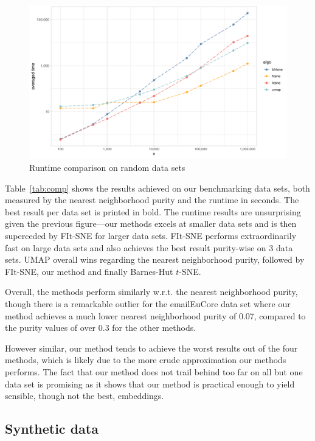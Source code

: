 \begin{figure}[tb]
  \centering
  \includegraphics[width=\textwidth]{img/runtime_comparison}
  \caption{Runtime comparison on random data sets}
  \label{fig:runtime-comp}
\end{figure}

Table~\ref{tab:comp} shows the results achieved on our benchmarking data sets, both
measured by the nearest neighborhood purity and the runtime in seconds. The best result
per data set is printed in bold. The runtime results are unsurprising given the previous
figure---our methods excels at smaller data sets and is then superceded by FIt-SNE
for larger data sets. FIt-SNE performs extraordinarily fast on large data sets and
also achieves the best result purity-wise on 3 data sets. UMAP overall wins regarding
the nearest neighborhood purity, followed by FIt-SNE, our method and finally Barnes-Hut
$t$-SNE.

Overall, the methods perform similarly w.r.t. the nearest neighborhood purity,
though there is a remarkable outlier for the emailEuCore data set where our
method achieves a much lower nearest neighborhood purity of 0.07, compared to
the purity values of over 0.3 for the other methods.

However similar, our method tends to achieve the worst results out of the four
methods, which is likely due to the more crude approximation our methods
performs. The fact that our method does not trail behind too far on all but one
data set is promising as it shows that our method is practical enough to yield
sensible, though not the best, embeddings.


\subsection{Synthetic data}

